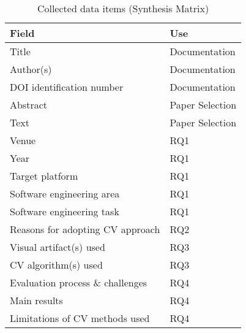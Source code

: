 
\begin{table}[t]
\caption{Collected data items (Synthesis Matrix)}
\centering
\renewcommand{\arraystretch}{1.2}
\setlength{\tabcolsep}{9pt}
\begin{tabular}{l l}
	\toprule
	\textbf{Field}                    & \textbf{Use}     \\ \midrule
	Title                             & Documentation    \\
	Author(s)                         & Documentation    \\
	DOI identification number         & Documentation   \\
	Abstract                          & Paper Selection \\
	Text                          & Paper Selection \\
	Venue                             & RQ1             \\
	Year                              & RQ1             \\
	Target platform                   & RQ1             \\
	Software engineering area         & RQ1             \\
	Software engineering task         & RQ1             \\
	Reasons for adopting CV approach  & RQ2             \\
	Visual artifact(s) used           & RQ3             \\
	CV algorithm(s) used    	      & RQ3             \\
	Evaluation process \& challenges  & RQ4             \\
	Main results                      & RQ4             \\
	Limitations of CV methods used    & RQ4             \\ \bottomrule
\end{tabular}
	\label{tbl:collected-info}
\end{table}
